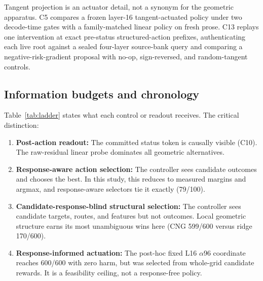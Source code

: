 Tangent projection is an actuator detail, not a synonym for the geometric apparatus. C5
compares a frozen layer-16 tangent-actuated policy under two decode-time gates with a
family-matched linear policy on fresh prose. C13 replays one intervention at exact
pre-status structured-action prefixes, authenticating each live root against a sealed
four-layer source-bank query and comparing a negative-risk-gradient proposal with no-op,
sign-reversed, and random-tangent controls.

\subsection{Information budgets and chronology}

Table~\ref{tab:ladder} states what each control or readout receives. The critical distinction:

\begin{enumerate}
    \item \textbf{Post-action readout:} The committed status token is causally visible
          (C10). The raw-residual linear probe dominates all geometric alternatives.
    \item \textbf{Response-aware action selection:} The controller sees candidate outcomes and
          chooses the best. In this study, this reduces to measured margins and argmax,
          and response-aware selectors tie it exactly (79/100).
    \item \textbf{Candidate-response-blind structural selection:} The controller sees candidate
          targets, routes, and features but not outcomes. Local geometric structure earns its
          most unambiguous wins here (CNG 599/600 versus ridge 170/600).
    \item \textbf{Response-informed actuation:} The post-hoc fixed L16 $\alpha$96 coordinate
          reaches 600/600 with zero harm, but was selected from whole-grid candidate rewards.
          It is a feasibility ceiling, not a response-free policy.
\end{enumerate}

